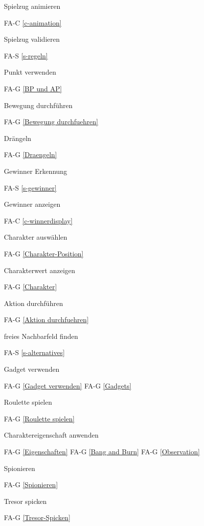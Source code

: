 Spielzug animieren

FA-C \ref{c-animation} %

Spielzug validieren

FA-S \ref{s-regeln} %

Punkt verwenden

FA-G \ref{BP und AP} %

Bewegung durchführen

FA-G \ref{Bewegung durchfuehren} %

Drängeln

FA-G \ref{Draengeln} %

Gewinner Erkennung

FA-S \ref{s-gewinner} %

Gewinner anzeigen

FA-C \ref{c-winnerdisplay} %

Charakter auswählen

FA-G \ref{Charakter-Position} %

Charakterwert anzeigen

FA-G \ref{Charakter} %

Aktion durchführen

FA-G \ref{Aktion durchfuehren} %

freies Nachbarfeld finden

FA-S \ref{s-alternatives} %

Gadget verwenden

FA-G \ref{Gadget verwenden} %
FA-G \ref{Gadgets} %

Roulette spielen

FA-G \ref{Roulette spielen} %

Charaktereigenschaft anwenden

FA-G \ref{Eigenschaften} %
FA-G \ref{Bang and Burn} %
FA-G \ref{Observation} %

Spionieren

FA-G \ref{Spionieren} %

Tresor spicken

FA-G \ref{Tresor-Spicken} %


